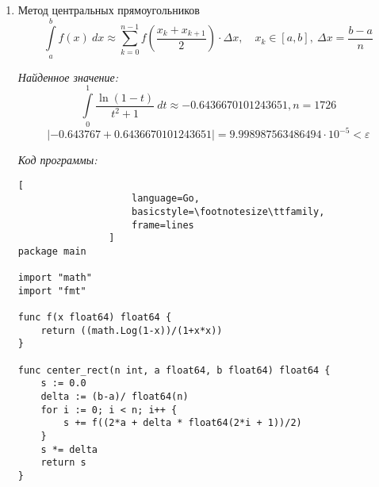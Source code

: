 \documentclass[14pt, a4paper, titlepage, fleqn]{extarticle}
\begin{document}
\begin{enumerate}
                \textit{Код программы:}
                \begin{lstlisting}[
                    language=Go,
                    basicstyle=\footnotesize\ttfamily,
                    frame=lines
                ]
package main

import "math"
import "fmt"

func f(x float64) float64 {
    return ((math.Log(1-x))/(1+x*x))
}

func right_rect(n int, a float64, b float64) float64 {
    s := 0.0
    delta := (b-a)/ float64(n)
    eps := 1e-5
    for i := 1; i <= n; i++ {
        if (i != n) {
            s += f(a + delta * float64(i))
        } else {
            s += f(a + delta * float64(i) - eps)
        }
    }
    s *= delta
    return s
}

func main() {
    n := 0
    eps := 1e-4
    a := 0.0
    b := 1.0
    real := -0.643767
    s := 10000
    n=0
    for math.Abs(real - s) >= eps {
        n++
        s = right_rect(n,a,b)
    }
    fmt.Println(s, n, math.Abs(real-s))
}
                \end{lstlisting}
                
                \item Метод центральных прямоугольников
                \[
                    \int\limits_a^b f(x) ~ dx \approx
                    \sum_{k=0}^{n-1} f\left( \frac{x_k + x_{k+1}}{2}\right)\cdot
                    \Delta x,
                    \quad x_k \in [a, b], ~ \Delta x = \frac{b-a}{n}
                \]

                \textit{Найденное значение:}
                \[
                    \int\limits_0^1 \frac{\ln(1-t)}{t^2+1} ~ dt \approx
                    -0.6436670101243651, n = 1726
                \]
                \[
                    |-0.643767+0.6436670101243651| = 9.998987563486494 
                    \cdot 10^{-5} < \varepsilon
                \]

                \textit{Код программы:}
                \begin{lstlisting}[
                    language=Go,
                    basicstyle=\footnotesize\ttfamily,
                    frame=lines
                ]
package main

import "math"
import "fmt"

func f(x float64) float64 {
    return ((math.Log(1-x))/(1+x*x))
}

func center_rect(n int, a float64, b float64) float64 {
    s := 0.0
    delta := (b-a)/ float64(n)
    for i := 0; i < n; i++ {
        s += f((2*a + delta * float64(2*i + 1))/2)
    }
    s *= delta
    return s
}


\end{lstlisting}
\end{enumerate}
\end{document}
